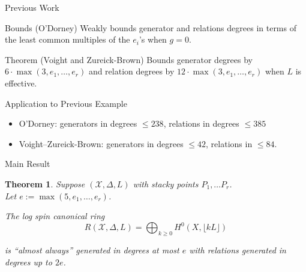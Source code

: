 \documentclass{beamer}
\newtheorem{thm}{Theorem}
\theoremstyle{remark}
\newcommand \sx{{\mathscr X}}
\newcommand{\halfcan}{L}
\begin{document}

\begin{frame}{Previous Work}
\begin{block}{Bounds (O'Dorney)}
Weakly bounds generator and relations degrees in terms of
the least common multiples of the $e_i$'s when $g = 0$.
\end{block}

\begin{block}{Theorem (Voight and Zureick-Brown)}
Bounds generator degrees by $6
\cdot \max(3, e_1, \ldots, e_r)$ and relation degrees by $12 \cdot \max
(3, e_1, \ldots, e_ r)$ when $\halfcan$ is effective.
\end{block}

\begin{block}{Application to Previous Example}
\begin{itemize}
\item O'Dorney: generators in degrees $\leq 238$, relations in degrees $\leq 385$
\item Voight--Zureick-Brown: generators in degrees $\leq 42$, relations in $\leq 84$.
\end{itemize}
\end{block}

\end{frame}


\begin{frame}{Main Result}
\begin{thm}
\label{thm:main}
Suppose $(\sx, \Delta, \halfcan)$ with stacky points $P_1, \ldots P_r$. \\
Let $e := \max(5, e_1, \ldots, e_r)$.

The log spin canonical ring 
\[
	R(\sx, \Delta, \halfcan) = \bigoplus_{k \geq 0} H^0(X, \lfloor k \halfcan \rfloor)
\]

\noindent
is ``almost always'' generated in degrees at most $e$ with
relations generated in degrees up to $2e$.
\end{thm}
\end{frame}

\end{document}
